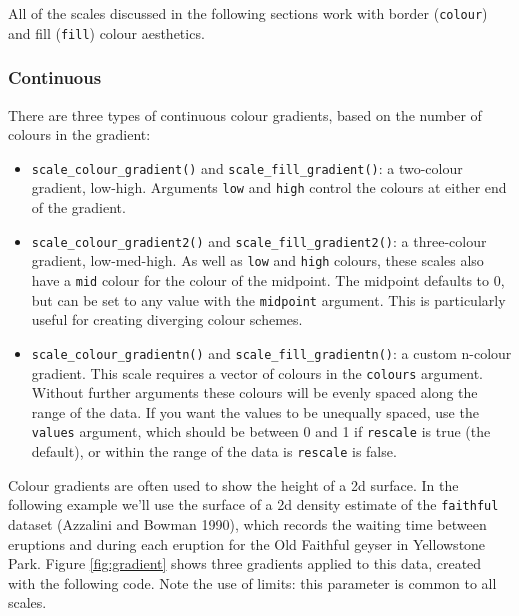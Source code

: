 All of the scales discussed in the following sections work with border
(\texttt{colour}) and fill (\texttt{fill}) colour aesthetics.

\subsubsection{Continuous}\label{ssub:colour-continuous}

There are three types of continuous colour gradients, based on the
number of colours in the gradient: 

\begin{itemize}
\itemsep1pt\parskip0pt
\item
  \texttt{scale\_colour\_gradient()} and
  \texttt{scale\_fill\_gradient()}: a two-colour gradient, low-high.
  Arguments \texttt{low} and \texttt{high} control the colours at either
  end of the gradient. 
\item
  \texttt{scale\_colour\_gradient2()} and
  \texttt{scale\_fill\_gradient2()}: a three-colour gradient,
  low-med-high. As well as \texttt{low} and \texttt{high} colours, these
  scales also have a \texttt{mid} colour for the colour of the midpoint.
  The midpoint defaults to 0, but can be set to any value with the
  \texttt{midpoint} argument. This is particularly useful for creating
  diverging colour schemes.
\item
  \texttt{scale\_colour\_gradientn()} and
  \texttt{scale\_fill\_gradientn()}: a custom n-colour gradient. This
  scale requires a vector of colours in the \texttt{colours} argument.
  Without further arguments these colours will be evenly spaced along
  the range of the data. If you want the values to be unequally spaced,
  use the \texttt{values} argument, which should be between 0 and 1 if
  \texttt{rescale} is true (the default), or within the range of the
  data is \texttt{rescale} is false.
\end{itemize}

Colour gradients are often used to show the height of a 2d surface. In
the following example we'll use the surface of a 2d density estimate of
the \texttt{faithful} dataset (Azzalini and Bowman 1990), which records
the waiting time between eruptions and during each eruption for the Old
Faithful geyser in Yellowstone Park. Figure \ref{fig:gradient} shows
three gradients applied to this data, created with the following code.
Note the use of limits: this parameter is common to all scales.

